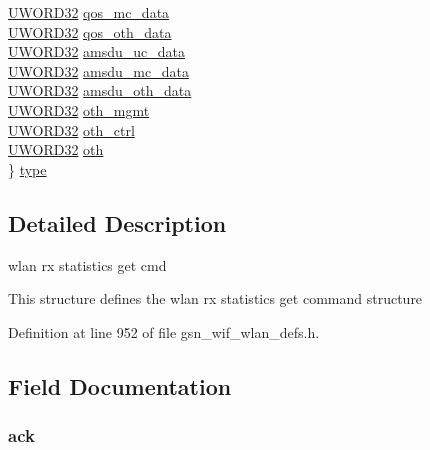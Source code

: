 \begin{DoxyCompactItemize}
\begin{tabbing}
\>\hyperlink{a00677_gad0599cef3ddc489e9b2fe8afc3159f12}{UWORD32} \hyperlink{a00398_a981f9b86badc745ce706ad7e14d64a8e}{qos\_mc\_data}\\
\>\hyperlink{a00677_gad0599cef3ddc489e9b2fe8afc3159f12}{UWORD32} \hyperlink{a00398_a0dbfc3afda9c28bcf2483e45df0dffc3}{qos\_oth\_data}\\
\>\hyperlink{a00677_gad0599cef3ddc489e9b2fe8afc3159f12}{UWORD32} \hyperlink{a00398_a2d2a88872a0d8626bcf602549fb14cfd}{amsdu\_uc\_data}\\
\>\hyperlink{a00677_gad0599cef3ddc489e9b2fe8afc3159f12}{UWORD32} \hyperlink{a00398_af88c580daca00ba48fbe3424d29c6578}{amsdu\_mc\_data}\\
\>\hyperlink{a00677_gad0599cef3ddc489e9b2fe8afc3159f12}{UWORD32} \hyperlink{a00398_aa9558314ad351a6dd66b8bdef839082b}{amsdu\_oth\_data}\\
\>\hyperlink{a00677_gad0599cef3ddc489e9b2fe8afc3159f12}{UWORD32} \hyperlink{a00398_af35bbce45ee30e4b704726ff63da07ca}{oth\_mgmt}\\
\>\hyperlink{a00677_gad0599cef3ddc489e9b2fe8afc3159f12}{UWORD32} \hyperlink{a00398_a7247d8d5dda9d44a5a35d9ce5af66f8f}{oth\_ctrl}\\
\>\hyperlink{a00677_gad0599cef3ddc489e9b2fe8afc3159f12}{UWORD32} \hyperlink{a00398_aba1f71ef75513044ac20c228b28cb956}{oth}\\
\} \hyperlink{a00398_a3131bef589b14e80731a9a8d09617dfb}{type}\\

\end{tabbing}\end{DoxyCompactItemize}


\subsection{Detailed Description}
wlan rx statistics get cmd 

This structure defines the wlan rx statistics get command structure 

Definition at line 952 of file gsn\_\-wif\_\-wlan\_\-defs.h.



\subsection{Field Documentation}
\hypertarget{a00398_af84b0b8a07ea6808ca860b7e788df2cc}{
\subsubsection[{ack}]{ {\bf ack}}}
\label{a00398_af84b0b8a07ea6808ca860b7e788df2cc}



